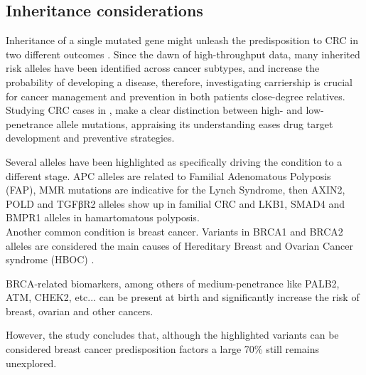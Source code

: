 \subsection{Inheritance considerations}
Inheritance of a single mutated gene might unleash the predisposition to CRC in two different outcomes \cite{Kinzler1996LessonsCancer}.
Since the dawn of high-throughput data, many inherited risk alleles have been identified across cancer subtypes, and increase the probability of developing a disease, therefore, investigating carriership is crucial for cancer management and prevention in both patients close-degree relatives.
\\

Studying CRC cases in \cite{DeLaChapelle2004GeneticCancer}, make a clear distinction between high- and low-penetrance allele mutations, appraising its understanding eases drug target development and preventive strategies. 

Several alleles have been highlighted as specifically driving the condition to a different stage. APC alleles are related to Familial Adenomatous Polyposis (FAP), MMR mutations are indicative for the Lynch Syndrome, then AXIN2, POLD and TGFβR2 alleles show up in familial CRC and LKB1, SMAD4 and BMPR1 alleles in hamartomatous polyposis.
\\

Another common condition is breast cancer. Variants in BRCA1 and BRCA2 alleles are considered the main causes of Hereditary Breast and Ovarian Cancer syndrome (HBOC) \cite{Turnbull2008GeneticFuture} \cite{Foulkes2003GermlineCancer} \cite{Mavaddat2013CancerEMBRACE}.

BRCA-related biomarkers, among others of medium-penetrance like PALB2, ATM, CHEK2, etc... can be present at birth and significantly increase the risk of breast, ovarian and other cancers.

However, the study concludes that, although the highlighted variants can be considered breast cancer predisposition factors a large 70\% still remains unexplored.